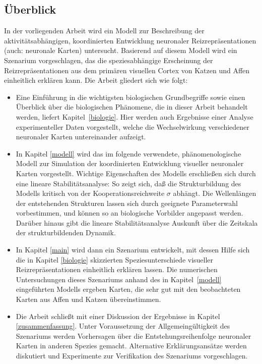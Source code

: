 \subsection{Überblick}

In der vorliegenden Arbeit wird ein Modell zur Beschreibung der
aktivitätsabhängigen, koordinierten Entwicklung neuronaler
Reizrepräsentationen (auch: neuronale Karten) untersucht.  Basierend auf
diesem Modell wird ein Szenarium vorgeschlagen, das die speziesabhängige
Erscheinung der Reizrepräsentationen aus dem primären visuellen Cortex
von Katzen und Affen einheitlich erklären kann.  Die Arbeit gliedert sich
wie folgt:

\begin{itemize}
\item Eine Einführung in die wichtigsten biologischen Grundbegriffe sowie
einen Überblick über die biologischen Phänomene, die in dieser Arbeit
behandelt werden, liefert Kapitel~\ref{biologie}. Hier werden auch
Ergebnisse einer Analyse experimenteller Daten vorgestellt, welche die
Wechselwirkung verschiedener neuronaler Karten untereinander aufzeigt.

\item In Kapitel \ref{modell} wird das im folgende verwendete,
phänomenologische Modell zur Simulation der koordinierten Entwicklung
visueller neuronaler Karten vorgestellt. Wichtige Eigenschaften des Modells
erschließen sich durch eine lineare Stabilitätsanalyse: So zeigt sich,
daß die Strukturbildung des Modells kritisch von der
Kooperationsreichweite $\sigma$ abhängt.  Die Wellenlängen der
entstehenden Strukturen lassen sich durch geeignete Parameterwahl
vorbestimmen, und können so an biologische Vorbilder angepasst werden.
Darüber hinaus gibt die lineare Stabilitätsanalyse Auskunft über die
Zeitskala der strukturbildenden Dynamik.

\item In Kapitel \ref{main} wird dann ein Szenarium entwickelt, mit dessen
Hilfe sich die in Kapitel \ref{biologie} skizzierten Speziesunterschiede
visueller Reizrepräsentationen einheitlich erklären lassen.  Die
numerischen Untersuchungen dieses Szenariums anhand des in
Kapitel~\ref{modell} eingeführten Modells ergeben Karten, die sehr gut mit
den beobachteten Karten aus Affen und Katzen übereinstimmen.

\item Die Arbeit schließt mit einer Diskussion der Ergebnisse in Kapitel
\ref{zusammenfassung}. Unter Voraussetzung der Allgemeingültigkeit des
Szenariums werden Vorhersagen über die Entstehungsreihenfolge neuronaler
Karten in anderen Spezies gemacht. Alternative Erklärungsansätze werden
diskutiert und Experimente zur Verifikation des Szenariums vorgeschlagen.
\end{itemize}
